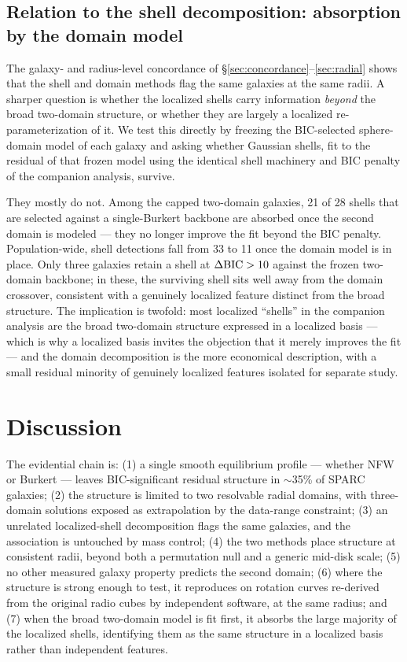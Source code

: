\documentclass[twocolumn]{aastex631}
\newcommand{\dbic}{\Delta{\rm BIC}}
\begin{document}
\subsection{Relation to the shell decomposition: absorption by the domain model} \label{sec:absorption}

The galaxy- and radius-level concordance of \S\ref{sec:concordance}--\ref{sec:radial}
shows that the shell and domain methods flag the same galaxies at the same radii.
A sharper question is whether the localized shells carry information \emph{beyond}
the broad two-domain structure, or whether they are largely a localized
re-parameterization of it. We test this directly by freezing the BIC-selected
sphere-domain model of each galaxy and asking whether Gaussian shells, fit to the
residual of that frozen model using the identical shell machinery and BIC penalty
of the companion analysis, survive.

They mostly do not. Among the capped two-domain galaxies, 21 of 28 shells that
are selected against a single-Burkert backbone are absorbed once the second
domain is modeled --- they no longer improve the fit beyond the BIC penalty.
Population-wide, shell detections fall from 33 to 11 once the domain model is in
place. Only three galaxies retain a shell at $\dbic > 10$ against the frozen
two-domain backbone; in these, the surviving shell sits well away from the domain
crossover, consistent with a genuinely localized feature distinct from the broad
structure. The implication is twofold: most localized ``shells'' in the companion
analysis are the broad two-domain structure expressed in a localized basis ---
which is why a localized basis invites the objection that it merely improves the
fit --- and the domain decomposition is the more economical description, with a
small residual minority of genuinely localized features isolated for separate
study.

\section{Discussion} \label{sec:discussion}

The evidential chain is: (1) a single smooth equilibrium profile ---
whether NFW or Burkert --- leaves BIC-significant residual structure in
$\sim$35\% of SPARC galaxies; (2) the structure is limited to two resolvable
radial domains, with three-domain solutions exposed as extrapolation by the
data-range constraint; (3) an unrelated localized-shell decomposition flags
the same galaxies, and the association is untouched by mass control; (4) the
two methods place structure at consistent radii, beyond both a permutation
null and a generic mid-disk scale; (5) no other measured galaxy property
predicts the second domain; (6) where the structure is strong enough to test,
it reproduces on rotation curves re-derived from the original radio cubes by
independent software, at the same radius; and (7) when the broad two-domain
model is fit first, it absorbs the large majority of the localized shells,
identifying them as the same structure in a localized basis rather than
independent features.
\end{document}
